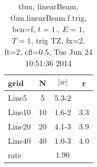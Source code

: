\begin{table}[hbt]\tableFont %
\begin{center}
\begin{tabular}{|l|c|c|c|} \hline 
grid  & N &  $\vert w \vert$   & r \\ \hline 
               Line5 &     5 & \num{5.3}{-2} &       \\ \hline
              Line10 &    10 & \num{1.6}{-2} &  3.3  \\ \hline
              Line20 &    20 & \num{4.1}{-3} &  3.9  \\ \hline
              Line40 &    40 & \num{1.0}{-3} &  4.0  \\ \hline
    rate             &       &  $1.90$       &       \\ \hline
\end{tabular}
\caption{tbm, linearBeam, tbm.linearBeam.f.trig, bcn=f, $t=1.$, $E=1$, $T=1$,  trig TZ, fx=2, ft=2, cfl=0.5, Tue Jun 24 10:51:36 2014}\label{table:tbm.linearBeam.f.trig}
\end{center}
\end{table}

